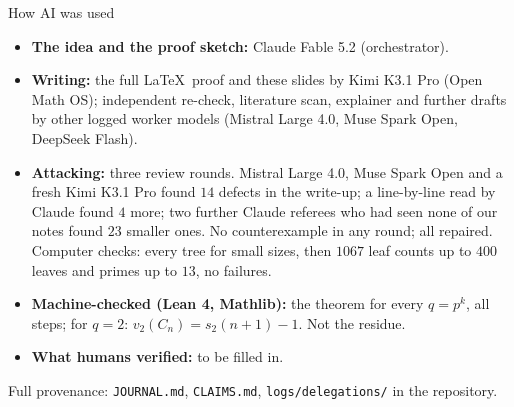 \documentclass[aspectratio=169,11pt]{beamer}
\begin{document}
\begin{frame}{How AI was used}
  \begin{itemize}
    \item \textbf{The idea and the proof sketch:} Claude Fable 5.2 (orchestrator).
    \item \textbf{Writing:} the full \LaTeX\ proof and these slides by Kimi K3.1 Pro
      (Open Math OS); independent re-check, literature scan, explainer and further
      drafts by other logged worker models (Mistral Large 4.0, Muse Spark Open,
      DeepSeek Flash).
    \item \textbf{Attacking:} three review rounds. Mistral Large 4.0, Muse Spark Open
      and a fresh Kimi K3.1 Pro found $14$ defects in the write-up; a line-by-line
      read by Claude found $4$ more; two further Claude referees who had seen none
      of our notes found $23$ smaller ones. No counterexample in any round; all
      repaired. Computer checks: every tree for small sizes, then $1067$ leaf counts
      up to $400$ leaves and primes up to $13$, no failures.
    \item \textbf{Machine-checked (Lean 4, Mathlib):} the theorem for every
      $q=p^k$, all steps; for $q=2$: $v_2(C_n)=s_2(n+1)-1$. Not the residue.
    \item \textbf{What humans verified:} \alert{to be filled in.}
  \end{itemize}
  \vfill
  {\small Full provenance: \texttt{JOURNAL.md}, \texttt{CLAIMS.md},
  \texttt{logs/delegations/} in the repository.}
\end{frame}
\end{document}
